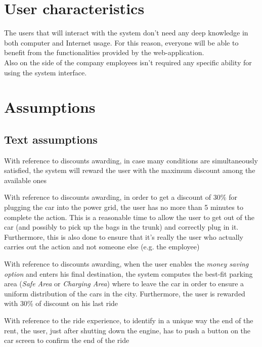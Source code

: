 \documentclass[11pt,a4paper]{report}
\begin{document}
\section{User characteristics}
The users that will interact with the system don't need any deep knowledge in both computer and Internet usage. For this reason, everyone will be able to benefit from the functionalities provided by the web-application.\\
Also on the side of the company employees isn't required any specific ability for using the system interface. 
\section{Assumptions}
\subsection{Text assumptions}
\begin{TA}
	\item With reference to discounts awarding, in case many conditions are simultaneously satisfied, the system will reward the user with the maximum discount among the available ones
	\item With reference to discounts awarding, in order to get a discount of 30\% for plugging the car into the power grid, the user has no more than 5 minutes to complete the action. This is a reasonable time to allow the user to get out of the car (and possibly to pick up the bags in the trunk) and correctly plug in it. Furthermore, this is also done to ensure that it's really the user who actually carries out the action and not someone else (e.g. the employee)
	\item With reference to discounts awarding, when the user enables the \textit{money saving option} and enters his final destination, the system computes the best-fit parking area (\textit{Safe Area} or \textit{Charging Area}) where to leave the car in order to ensure a uniform distribution of the cars in the city. Furthermore, the user is rewarded with 30\% of discount on his last ride
	\item With reference to the ride experience, to identify in a unique way the end of the rent, the user, just after shutting down the engine, has to push a button on the car screen to confirm the end of the ride
\end{TA}
\end{document}
